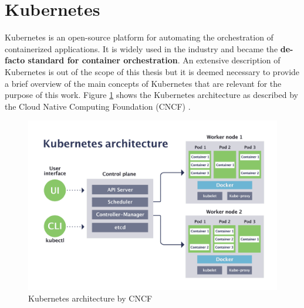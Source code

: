 \section{Kubernetes}

Kubernetes is an open-source platform for automating the orchestration of containerized applications.
It is widely used in the industry and became the \textbf{de-facto standard for container orchestration}.
An extensive description of Kubernetes is out of the scope of this thesis but it is deemed necessary to provide a brief overview of the main concepts of Kubernetes that are relevant for the purpose of this work.
Figure \ref{fig:kubernetes_architecture} shows the Kubernetes architecture as described by the Cloud Native Computing Foundation (CNCF) \cite{kubernetes_cnfc}.

\begin{figure}[htb]
    \centering
    \includegraphics[width=1\linewidth]{images/kubernetes-architecture-diagram.png}
    \caption{Kubernetes architecture by CNCF \cite{kubernetes_cnfc}}
    \label{fig:kubernetes_architecture}
\end{figure}

